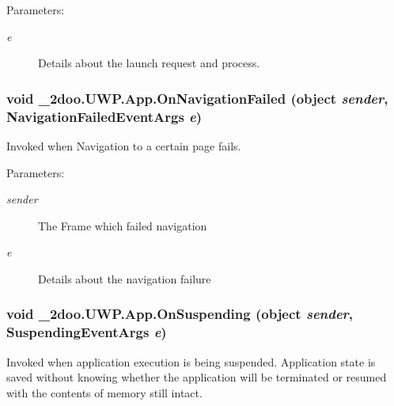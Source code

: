 \begin{Desc}
\item[Parameters:]
\begin{description}
\item[{\em e}]Details about the launch request and process.\end{description}
\end{Desc}
\hypertarget{class__2doo_1_1_u_w_p_1_1_app_2d5f47e28d011efc564daa7965ab010e}{
\subsubsection[{OnNavigationFailed}]{\setlength{\rightskip}{0pt plus 5cm}void \_\-2doo.UWP.App.OnNavigationFailed (object {\em sender}, \/  NavigationFailedEventArgs {\em e})}}
\label{class__2doo_1_1_u_w_p_1_1_app_2d5f47e28d011efc564daa7965ab010e}


Invoked when Navigation to a certain page fails. 

\begin{Desc}
\item[Parameters:]
\begin{description}
\item[{\em sender}]The Frame which failed navigation\item[{\em e}]Details about the navigation failure\end{description}
\end{Desc}
\hypertarget{class__2doo_1_1_u_w_p_1_1_app_7f85cfd8651c73a9a0d6d60da06317b7}{
\subsubsection[{OnSuspending}]{\setlength{\rightskip}{0pt plus 5cm}void \_\-2doo.UWP.App.OnSuspending (object {\em sender}, \/  SuspendingEventArgs {\em e})}}
\label{class__2doo_1_1_u_w_p_1_1_app_7f85cfd8651c73a9a0d6d60da06317b7}


Invoked when application execution is being suspended. Application state is saved without knowing whether the application will be terminated or resumed with the contents of memory still intact. 

